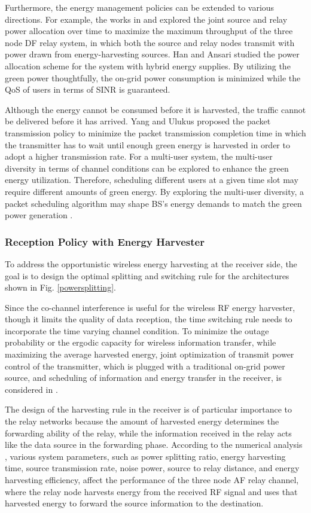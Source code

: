 \documentclass[journal,12pt,onecolumn]{IEEEtran}
\begin{document}
Furthermore, the energy management policies can be extended to various directions. For example, the works in \cite{6363767} and \cite{6381384} explored the joint source and relay power allocation over time to maximize the maximum throughput of the three node DF relay system, in which both the source and relay nodes transmit with power drawn from energy-harvesting sources. Han and Ansari \cite{Han:2012:ICE} studied the power allocation scheme for the system with hybrid energy supplies. By utilizing the green power thoughtfully, the on-grid power consumption is minimized while the QoS of users in terms of SINR is guaranteed. 


Although the energy cannot be consumed before it is harvested, the traffic cannot be delivered before it has arrived. Yang and Ulukus \cite{6094139} proposed the packet transmission policy to minimize the packet transmission completion time in which the transmitter has to wait until enough green energy is harvested in order to adopt a higher transmission rate. For a multi-user system, the multi-user diversity in terms of channel conditions can be explored to enhance the green energy utilization. Therefore, scheduling different users at a given time slot may require different amounts of green energy. By exploring the multi-user diversity, a packet scheduling algorithm may shape BS's energy demands to match the green power generation \cite{6655120}. 



\subsubsection{Reception Policy with Energy Harvester}
To address the opportunistic wireless energy harvesting at the receiver side, the goal is to design the optimal splitting and switching rule for the architectures shown in Fig. \ref{powersplitting}. 

Since the co-channel interference is useful for the wireless RF energy harvester, though it limits the quality of data reception, the time switching rule needs to incorporate the time varying channel condition. To minimize the outage probability or the ergodic capacity for wireless information transfer, while maximizing the average harvested energy, joint optimization of transmit power control of the transmitter, which is plugged with a traditional on-grid power source, and scheduling of information and energy transfer in the receiver, is considered in \cite{6373669}.

The design of the harvesting rule in the receiver is of particular importance to the relay networks because the amount of harvested energy determines the forwarding ability of the relay, while the information received in the relay acts like the data source in the forwarding phase. According to the numerical analysis \cite{6552840}, various system parameters, such as power splitting ratio, energy harvesting time, source transmission rate, noise power, source to relay distance, and energy harvesting efficiency, affect the performance of the three node AF relay channel, where the relay node harvests energy from the received RF signal and uses that harvested energy to forward the source information to the destination.
\end{document}

